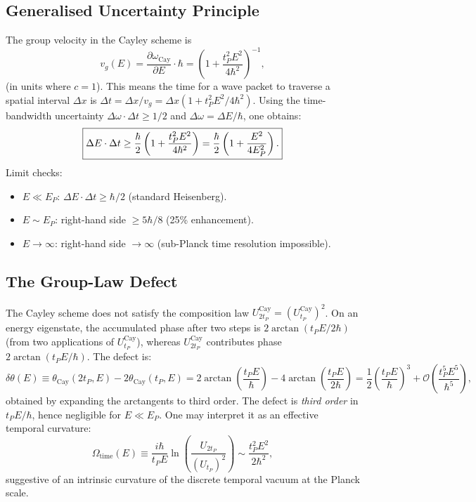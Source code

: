 \documentclass[12pt,a4paper]{article}
\begin{document}
\subsection{Generalised Uncertainty Principle}
\label{sec:gup}

The group velocity in the Cayley scheme is
\begin{equation}
  v_g(E) = \frac{\partial \omega_{\mathrm{Cay}}}{\partial E}\cdot\hbar
  = \left(1 + \frac{t_P^2 E^2}{4\hbar^2}\right)^{-1},
  \label{eq:group_vel_E}
\end{equation}
(in units where $c=1$). This means the time for a wave packet to traverse a spatial
interval $\Delta x$ is
$\Delta t = \Delta x / v_g = \Delta x (1 + t_P^2 E^2/4\hbar^2)$.
Using the time-bandwidth uncertainty $\Delta\omega \cdot \Delta t \geq 1/2$ and
$\Delta\omega = \Delta E/\hbar$, one obtains:
\begin{equation}
  \boxed{%
  \Delta E \cdot \Delta t
  \geq \frac{\hbar}{2}\left(1 + \frac{t_P^2 E^2}{4\hbar^2}\right)
  = \frac{\hbar}{2}\left(1 + \frac{E^2}{4 E_P^2}\right).
  }
  \label{eq:gup}
\end{equation}
Limit checks:
\begin{itemize}
  \item $E \ll E_P$: $\Delta E \cdot \Delta t \geq \hbar/2$ (standard Heisenberg).
  \item $E \sim E_P$: right-hand side $\geq 5\hbar/8$ (25\% enhancement).
  \item $E \to \infty$: right-hand side $\to \infty$ (sub-Planck time resolution
        impossible).
\end{itemize}

\subsection{The Group-Law Defect}
\label{sec:group_defect}

The Cayley scheme does not satisfy the composition law
$U_{2t_P}^{\mathrm{Cay}} = (U_{t_P}^{\mathrm{Cay}})^2$.
On an energy eigenstate, the accumulated phase after two steps is
$2\arctan(t_P E/2\hbar)$ (from two applications of $U_{t_P}^{\mathrm{Cay}}$), whereas
$U_{2t_P}^{\mathrm{Cay}}$ contributes phase $2\arctan(t_P E/\hbar)$.  The defect is:
\begin{equation}
  \delta\theta(E)
  \equiv \theta_{\mathrm{Cay}}(2t_P, E) - 2\theta_{\mathrm{Cay}}(t_P, E)
  = 2\arctan\!\left(\frac{t_P E}{\hbar}\right)
    - 4\arctan\!\left(\frac{t_P E}{2\hbar}\right)
  = \frac{1}{2}\left(\frac{t_P E}{\hbar}\right)^3 + \mathcal{O}\!\left(\frac{t_P^5 E^5}{\hbar^5}\right),
  \label{eq:group_defect}
\end{equation}
obtained by expanding the arctangents to third order.  The defect is \emph{third order}
in $t_P E/\hbar$, hence negligible for $E \ll E_P$.  One may interpret it as an effective
temporal curvature:
\begin{equation}
  \Omega_{\mathrm{time}}(E)
  \equiv \frac{i\hbar}{t_P E}\ln\!\left(\frac{U_{2t_P}}{(U_{t_P})^2}\right)
  \sim \frac{t_P^2 E^2}{2\hbar^2},
  \label{eq:temporal_curvature}
\end{equation}
suggestive of an intrinsic curvature of the discrete temporal vacuum at the Planck scale.
\end{document}
